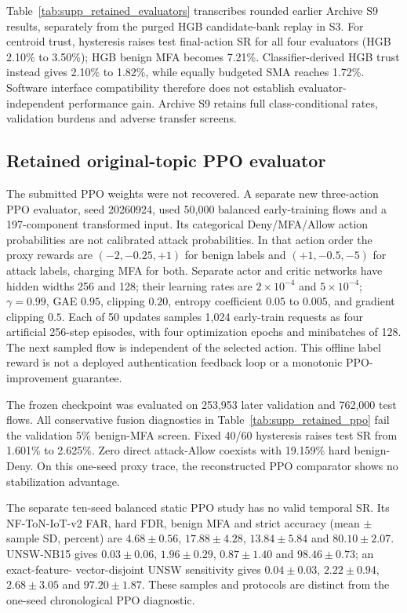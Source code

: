 \documentclass[10pt,onecolumn]{IEEEtran}
\begin{document}
Table~\ref{tab:supp_retained_evaluators} transcribes rounded
earlier Archive S9 results, separately from the purged
HGB candidate-bank replay in S3. For
centroid trust, hysteresis raises test final-action SR for
all four evaluators (HGB 2.10\% to 3.50\%); HGB benign
MFA becomes 7.21\%. Classifier-derived HGB trust instead
gives 2.10\% to 1.82\%, while equally budgeted SMA reaches
1.72\%. Software interface compatibility therefore does
not establish evaluator-independent performance gain.
Archive S9 retains full class-conditional rates, validation
burdens and adverse transfer screens.

\subsection{Retained original-topic PPO evaluator}
The submitted PPO weights were not recovered. A separate
new three-action PPO evaluator, seed 20260924, used
50,000 balanced early-training flows and a 197-component
transformed input. Its categorical Deny/MFA/Allow action
probabilities are not calibrated attack probabilities.
In that action order the proxy rewards are
\((-2,-0.25,+1)\) for benign labels and
\((+1,-0.5,-5)\) for attack labels, charging MFA for
both. Separate actor and critic networks have hidden
widths 256 and 128; their learning rates are
\(2\times10^{-4}\) and \(5\times10^{-4}\);
\(\gamma=0.99\), GAE \(0.95\), clipping \(0.20\),
entropy coefficient \(0.05\) to \(0.005\), and
gradient clipping \(0.5\). Each of 50 updates samples
1,024 early-train requests as four artificial 256-step
episodes, with four optimization epochs and minibatches
of 128. The next sampled flow is independent of the
selected action. This offline label reward is not a
deployed authentication feedback loop or a monotonic
PPO-improvement guarantee.

The frozen checkpoint was evaluated on 253,953 later
validation and 762,000 test flows. All conservative
fusion diagnostics in Table~\ref{tab:supp_retained_ppo}
fail the validation 5\% benign-MFA screen. Fixed
40/60 hysteresis raises test SR from 1.601\% to
2.625\%. Zero direct attack-Allow coexists with
19.159\% hard benign-Deny. On this one-seed proxy
trace, the reconstructed PPO comparator shows no
stabilization advantage.

The separate ten-seed balanced static PPO study has no
valid temporal SR. Its NF-ToN-IoT-v2 FAR, hard FDR,
benign MFA and strict accuracy (mean \(\pm\) sample SD,
percent) are \(4.68\pm0.56\), \(17.88\pm4.28\),
\(13.84\pm5.84\) and \(80.10\pm2.07\).
UNSW-NB15 gives \(0.03\pm0.06\), \(1.96\pm0.29\),
\(0.87\pm1.40\) and \(98.46\pm0.73\); an exact-feature-
vector-disjoint UNSW sensitivity gives \(0.04\pm0.03\),
\(2.22\pm0.94\), \(2.68\pm3.05\) and \(97.20\pm1.87\).
These samples and protocols are distinct from the
one-seed chronological PPO diagnostic.
\end{document}
